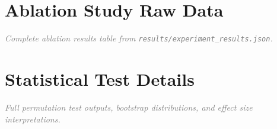 \documentclass[11pt,a4paper]{article}
\newcommand{\placeholder}[1]{\textcolor{gray}{\textit{#1}}}
\begin{document}
\section{Ablation Study Raw Data}
\label{app:ablation}

\placeholder{Complete ablation results table from
\texttt{results/experiment\_results.json}.}

\section{Statistical Test Details}
\label{app:stats}

\placeholder{Full permutation test outputs, bootstrap distributions,
and effect size interpretations.}
\end{document}
